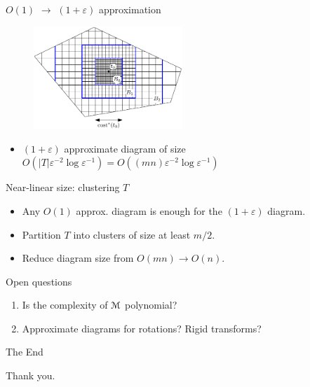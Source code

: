 \documentclass[xcolor={dvipsnames,usenames}]{beamer}
\newcommand{\eps}{\varepsilon}
\def\abs#1{\mathopen| #1 \mathclose|}		%
\newcommand{\M}{\EuScript{M}}
\begin{document}
\begin{frame}{$O(1)$ $\rightarrow$ $(1+\eps)$ approximation}
\begin{figure}
\begin{center}
\includegraphics[width=0.5\textwidth,page=1]{nested-grid-crop}%
\end{center}
\end{figure}
\begin{itemize}
\item $(1+\eps)$ approximate diagram of size
	$O(\abs{T}\eps^{-2}\log\eps^{-1}) = O((mn)\eps^{-2}\log\eps^{-1})$
\end{itemize}
\end{frame}

\begin{frame}{Near-linear size: clustering $T$}
\begin{itemize}
\item Any $O(1)$ approx. diagram is enough for the $(1+\eps)$ diagram.
\item Partition $T$ into clusters of size at least $m/2$.
\item Reduce diagram size from $O(mn) \rightarrow O(n)$.
\end{itemize}
\end{frame}

\begin{frame}{Open questions}
\begin{enumerate}
\item Is the complexity of $\M$ polynomial?
\item Approximate diagrams for rotations? Rigid transforms?
\end{enumerate}
\end{frame}

\begin{frame}{The End}
\begin{center}
	Thank you.
\end{center}
\end{frame}

%
%
\end{document}
